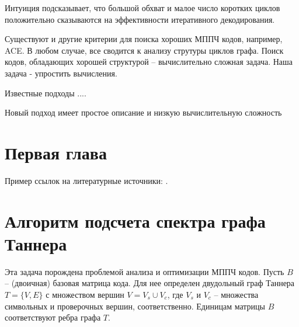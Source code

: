 \documentclass[specification,annotation,times]{itmo-student-thesis}
\begin{document}

\tableofcontents

\startprefacepage

Интуиция подсказывает, что большой обхват и 
малое число коротких циклов положительно сказываются на эффективности 
итеративного декодирования.

Существуют и другие критерии для поиска хороших МППЧ кодов, например, ACE. 
В любом случае, все сводится к анализу струтуры циклов графа. 
Поиск кодов, обладающих хорошей  структурой -- вычислительно сложная задача.
Наша задача - упростить вычисления. 

Известные подходы ....

Новый подход имеет простое описание и низкую вычислительную сложность

\chapter{Первая глава}

Пример ссылок на литературные источники: \cite{hall-combinatorics,kudryashov-codingtheory,finding-and-counting-given-length-cycles,counting-short-cycles-of-quasi-cyclic-protograph-ldpc-codes,message-passing-algorithm-for-counting-short-cycles-in-graph,how-to-find-long-paths-efficiently,color-coding,algorithm-for-counting-for-counting-short-cycles-in-bipartite-graphs,opencl-cuda-algorithms-for-parallel-decoding-of-any-irregular-ldpc-code-using-gpu,stressing-the-ber-simulation-of-ldpc-codes-in-the-error-floor-region-using-gpu-clusters,on-the-number-of-cycles-in-a-graph,understanding-belief-propogation,mackay-codes}.

\chapter{Алгоритм подсчета спектра графа Таннера}

Эта задача порождена проблемой анализа и оптимизации МППЧ кодов. 
Пусть $B$  -- (двоичная) базовая матрица кода.
Для нее определен двудольный граф Таннера $T=\{V, E \}$ с множеством вершин 
$V= V_s \cup V_c$, где  $V_s$ и  $V_c$ -- множества символьных и проверочных вершин, 
соответственно. Единицам  матрицы $B$ соответствуют ребра графа $T$. 
\end{document}
